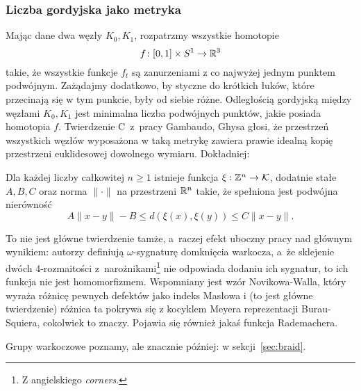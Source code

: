 
\subsubsection{Liczba gordyjska jako metryka}
Mając dane dwa węzły $K_0, K_1$, rozpatrzmy wszystkie homotopie
\begin{equation}
    f \colon [0,1] \times S^1 \to \mathbb R^3
\end{equation}
takie, że wszystkie funkcje $f_t$ są zanurzeniami z co najwyżej jednym punktem podwójnym.
Zażądajmy dodatkowo, by styczne do krótkich łuków, które przecinają się w tym punkcie, były od siebie różne.
Odległością gordyjską między węzłami $K_0, K_1$ jest minimalna liczba podwójnych punktów, jakie posiada homotopia $f$.
Twierdzenie C~z~pracy Gambaudo, Ghysa \cite{gambaudo05} głosi, że przestrzeń wszystkich węzłów wyposażona w taką metrykę zawiera prawie idealną kopię przestrzeni euklidesowej dowolnego wymiaru.
%
%
Dokładniej:

\begin{proposition}
    Dla każdej liczby całkowitej $n \ge 1$ istnieje funkcja $\xi: \mathbb Z^n \to \mathcal{K}$, dodatnie stałe $A, B, C$ oraz norma $\|\cdot\|$ na przestrzeni $\mathbb R^n$ takie, że spełniona jest podwójna nierówność
    \begin{equation}
        A\|x-y\| - B \le d(\xi(x), \xi(y)) \le C\|x-y\|.
    \end{equation}
\end{proposition}

To nie jest główne twierdzenie tamże, a~raczej efekt uboczny pracy nad głównym wynikiem: autorzy definiują $\omega$-sygnaturę domknięcia warkocza, a~że sklejenie dwóch 4-rozmaitości z~narożnikami\footnote{Z angielskiego \emph{corners}.} nie odpowiada dodaniu ich sygnatur, to ich funkcja nie jest homomorfizmem.
%
Wspomniany jest wzór Novikowa-Walla, który wyraża różnicę pewnych defektów jako indeks Masłowa i (to jest główne twierdzenie) różnica ta pokrywa się z kocyklem Meyera reprezentacji Burau-Squiera, cokolwiek to znaczy.
Pojawia się również jakaś funkcja Rademachera.
%
%
%
%
%

Grupy warkoczowe poznamy, ale znacznie później: w sekcji~\ref{sec:braid}.

